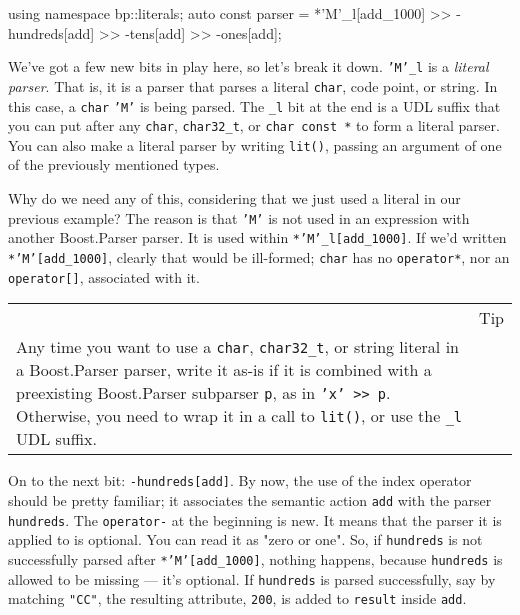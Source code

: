 \begin{code}
using namespace bp::literals;
auto const parser =
    *'M'_l[add_1000] >> -hundreds[add] >> -tens[add] >> -ones[add];
\end{code}

We've got a few new bits in play here, so let's break it down. \texttt{'M'\_l} is a \emph{literal parser}. That is, it is a parser that parses a literal \texttt{char}, code point, or string. In this case, a \texttt{char} \texttt{'M'} is being parsed. The \texttt{\_l} bit at the end is a UDL suffix that you can put after any \texttt{char}, \texttt{char32\_t}, or \texttt{char const *} to form a literal parser. You can also make a literal parser by writing \texttt{lit()}, passing an argument of one of the previously mentioned types.

Why do we need any of this, considering that we just used a literal  in our previous example? The reason is that \texttt{'M'} is not used in an expression with another Boost.Parser parser. It is used within \texttt{*'M'\_l{[}add\_1000{]}}. If we'd written \texttt{*'M'{[}add\_1000{]}}, clearly that would be ill-formed; \texttt{char} has no \texttt{operator*}, nor an \texttt{operator{[}{]}}, associated with it.

\begin{longtable}[]{@{}
  >{\raggedright\arraybackslash}p{}
  >{\raggedright\arraybackslash}p{}@{}}
\toprule\noalign{}
\endhead
\bottomrule\noalign{}
\endlastfoot
\begin{minipage}[t]{\linewidth}\raggedright
\end{minipage} & Tip \\
Any time you want to use a \texttt{char}, \texttt{char32\_t}, or string literal in a Boost.Parser parser, write it as-is if it is combined with a preexisting Boost.Parser subparser \texttt{p}, as in \texttt{'x' >> p}. Otherwise, you need to wrap it in a call to \texttt{lit()}, or use the \texttt{\_l} UDL suffix. & \\
\end{longtable}

On to the next bit: \texttt{-hundreds{[}add{]}}. By now, the use of the index operator should be pretty familiar; it associates the semantic action \texttt{add} with the parser \texttt{hundreds}. The \texttt{operator-} at the beginning is new. It means that the parser it is applied to is optional. You can read it as "zero or one". So, if \texttt{hundreds} is not successfully parsed after \texttt{*'M'{[}add\_1000{]}}, nothing happens, because \texttt{hundreds} is allowed to be missing --- it's optional. If \texttt{hundreds} is parsed successfully, say by matching \texttt{"CC"}, the resulting attribute, \texttt{200}, is added to \texttt{result} inside \texttt{add}.

